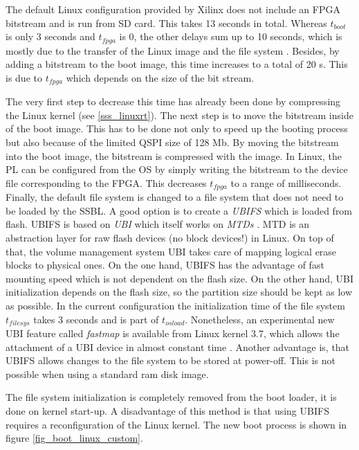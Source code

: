 The default Linux configuration provided by Xilinx does not include an \ac{FPGA} bitstream and is run from \ac{SD} card.
This takes 13 seconds in total.
Whereas $t_{boot}$ is only 3 seconds and $t_{fpga}$ is 0, the other delays sum up to 10 seconds, which is mostly due to the transfer of the Linux image and the file system . 
Besides, by adding a bitstream to the boot image, this time increases to a total of 20 s. 
This is due to $ t_{fpga} $ which depends on the size of the bit stream.   
\par
The very first step to decrease this time has already been done by compressing the Linux kernel (see \ref{sss_linuxrt}).
The next step is to move the bitstream inside of the boot image.
This has to be done not only to speed up the booting process but also because of the limited \ac{QSPI} size of 128 Mb.
By moving the bitstream into the boot image, the bitstream is compressed with the image. 
In Linux, the \ac{PL} can be configured from the \ac{OS} by simply writing the bitstream to the device file corresponding to the \ac{FPGA}. 
This decreases $t_{fpga}$ to a range of milliseconds. 
Finally, the default file system is changed to a file system that does not need to be loaded by the \ac{SSBL}.
A good option is to create a \textit{\ac{UBIFS}} \cite{ubifs} which is loaded from flash.
\ac{UBIFS} is based on \textit{\ac{UBI}} which itself works on \textit{\acp{MTD}} \cite{mtd}.
\ac{MTD} is an abstraction layer for raw flash devices (no block devices!) in Linux.
On top of that, the volume management system \ac{UBI} takes care of mapping logical erase blocks to physical ones.  
On the one hand, \ac{UBIFS} has the advantage of fast mounting speed which is not dependent on the flash size.
On the other hand, \ac{UBI} initialization depends on the flash size, so the partition size should be kept as low as possible.
In the current configuration the initialization time of the file system $t_{filesys}$ takes 3 seconds and is part of $t_{osload}$.
Nonetheless, an experimental new \ac{UBI} feature called \textit{fastmap} is available from Linux kernel 3.7, which allows the attachment of a \ac{UBI} device in almost constant time \cite{ubi}.
Another advantage is, that \ac{UBIFS} allows changes to the file system to be stored at power-off.
This is not possible when using a standard ram disk image.
\par
The file system initialization is completely removed from the boot loader, it is done on kernel start-up.
A disadvantage of this method is that using \ac{UBIFS} requires a reconfiguration of the Linux kernel.
The new boot process is shown in figure \ref{fig_boot_linux_custom}. 

